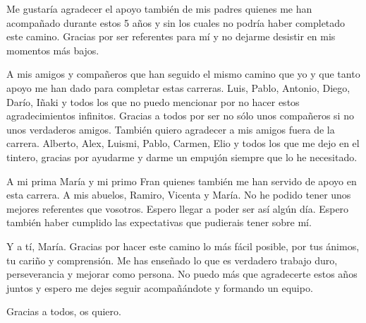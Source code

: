 Me gustaría agradecer el apoyo también de mis padres quienes me han acompañado durante estos 5 años y sin los cuales no podría haber completado este camino. Gracias por ser referentes para mí y no dejarme desistir en mis momentos más bajos.

A mis amigos y compañeros que han seguido el mismo camino que yo y que tanto apoyo me han dado para completar estas carreras. Luis, Pablo, Antonio, Diego, Darío, Iñaki y todos los que no puedo mencionar por no hacer estos agradecimientos infinitos. Gracias a todos por ser no sólo unos compañeros si no unos verdaderos amigos. También quiero agradecer a mis amigos fuera de la carrera. Alberto, Alex, Luismi, Pablo, Carmen, Elio y todos los que me dejo en el tintero, gracias por ayudarme y darme un empujón siempre que lo he necesitado.

A mi prima María y mi primo Fran quienes también me han servido de apoyo en esta carrera. A mis abuelos, Ramiro, Vicenta y María. No he podido tener unos mejores referentes que vosotros. Espero llegar a poder ser así algún día. Espero también haber cumplido las expectativas que pudierais tener sobre mí.

Y a tí, María. Gracias por hacer este camino lo más fácil posible, por tus ánimos, tu cariño y comprensión. Me has enseñado lo que es verdadero trabajo duro, perseverancia y mejorar como persona. No puedo más que agradecerte estos años juntos y espero me dejes seguir acompañándote y formando un equipo.

Gracias a todos, os quiero.
